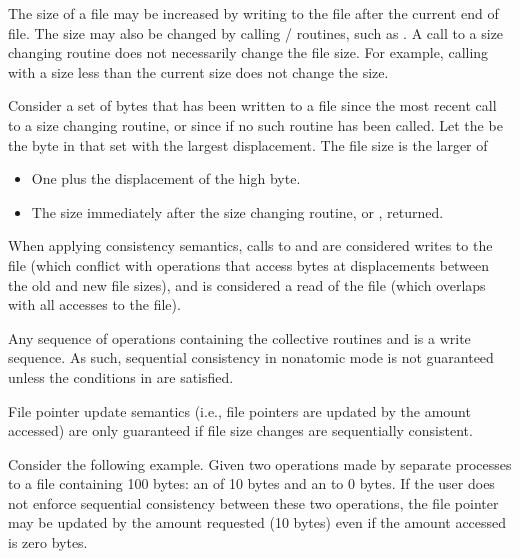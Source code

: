 The size of a file may be increased by writing to the file after the
current end of file.  The size may also be changed by calling
\MPI/  routines, 
such as .  A call to a size changing routine 
does not necessarily change the file size.  For example, calling
 with a size less than the current size does
not change the size.

Consider a set of bytes that has been written to a file since
the most recent call to a size changing routine, 
or since  if no such routine has been called.
Let the  be the byte
in that set with the largest displacement.  The file size
is the larger of
\begin{itemize}
\item   One plus the displacement of the high byte.
\item   The size immediately after the size changing routine,
        or , returned.
\end{itemize}

When applying consistency semantics,
calls to  and 
are considered writes to the file
(which conflict with operations that access bytes
at displacements between the old and new file sizes),
and  is considered a read of the file
(which overlaps with all accesses to the file).

\begin{users}
Any sequence of operations containing the collective routines
 and 
is a write sequence.
As such, sequential consistency in nonatomic mode is not 
guaranteed unless the conditions in 
are satisfied.
\end{users}

File pointer update semantics (i.e., file pointers are 
updated by the amount accessed) are only guaranteed if file size
changes are sequentially consistent.

\begin{users}
Consider the following example.  Given two operations made by
separate processes to a file containing 100 bytes:  an 
 of 10 bytes and an  to 0
bytes.  If the user does not enforce sequential consistency 
between these two operations,
the file pointer may be updated by the amount
requested (10 bytes) even if the amount accessed is zero bytes.
\end{users}

